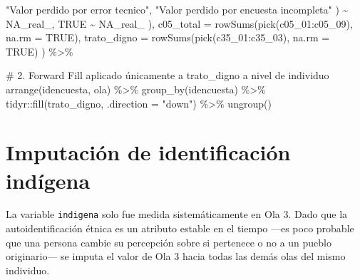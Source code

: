 \documentclass[
  spanish,
  a4paper,
  oneside]{scrbook}
\newenvironment{Shaded}{\begin{snugshade}}{\end{snugshade}}
\newcommand{\AttributeTok}[1]{\textcolor[rgb]{0.40,0.45,0.13}{#1}}
\newcommand{\CommentTok}[1]{\textcolor[rgb]{0.37,0.37,0.37}{#1}}
\newcommand{\ConstantTok}[1]{\textcolor[rgb]{0.56,0.35,0.01}{#1}}
\newcommand{\FunctionTok}[1]{\textcolor[rgb]{0.28,0.35,0.67}{#1}}
\newcommand{\NormalTok}[1]{\textcolor[rgb]{0.00,0.23,0.31}{#1}}
\newcommand{\SpecialCharTok}[1]{\textcolor[rgb]{0.37,0.37,0.37}{#1}}
\newcommand{\StringTok}[1]{\textcolor[rgb]{0.13,0.47,0.30}{#1}}
\begin{document}
\begin{Shaded}
\begin{Highlighting}[]
        \StringTok{"Valor perdido por error tecnico"}\NormalTok{,}
        \StringTok{"Valor perdido por encuesta incompleta"}
\NormalTok{      ) }\SpecialCharTok{\textasciitilde{}} \ConstantTok{NA\_real\_}\NormalTok{,}
      \ConstantTok{TRUE} \SpecialCharTok{\textasciitilde{}} \ConstantTok{NA\_real\_}
\NormalTok{    ),}
    \AttributeTok{c05\_total =} \FunctionTok{rowSums}\NormalTok{(}\FunctionTok{pick}\NormalTok{(c05\_01}\SpecialCharTok{:}\NormalTok{c05\_09), }\AttributeTok{na.rm =} \ConstantTok{TRUE}\NormalTok{),}
    \AttributeTok{trato\_digno =} \FunctionTok{rowSums}\NormalTok{(}\FunctionTok{pick}\NormalTok{(c35\_01}\SpecialCharTok{:}\NormalTok{c35\_03), }\AttributeTok{na.rm =} \ConstantTok{TRUE}\NormalTok{)}
\NormalTok{  ) }\SpecialCharTok{\%\textgreater{}\%}
  
  \CommentTok{\# 2. Forward Fill aplicado únicamente a \textquotesingle{}trato\_digno\textquotesingle{} a nivel de individuo}
  \FunctionTok{arrange}\NormalTok{(idencuesta, ola) }\SpecialCharTok{\%\textgreater{}\%} 
  \FunctionTok{group\_by}\NormalTok{(idencuesta) }\SpecialCharTok{\%\textgreater{}\%} 
\NormalTok{  tidyr}\SpecialCharTok{::}\FunctionTok{fill}\NormalTok{(trato\_digno, }\AttributeTok{.direction =} \StringTok{"down"}\NormalTok{) }\SpecialCharTok{\%\textgreater{}\%} 
  \FunctionTok{ungroup}\NormalTok{()}
\end{Highlighting}
\end{Shaded}

\section{Imputación de identificación
indígena}\label{imputaciuxf3n-de-identificaciuxf3n-induxedgena}

La variable \texttt{indigena} solo fue medida sistemáticamente en Ola 3.
Dado que la autoidentificación étnica es un atributo estable en el
tiempo ---es poco probable que una persona cambie su percepción sobre si
pertenece o no a un pueblo originario--- se imputa el valor de Ola 3
hacia todas las demás olas del mismo individuo.
\end{document}
